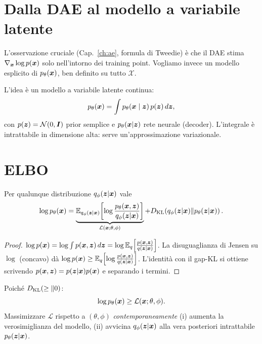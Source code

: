 \section{Dalla DAE al modello a variabile latente}

L'osservazione cruciale (Cap.~\ref{ch:ae}, formula di Tweedie) è che il DAE stima $\nabla_{\bm{x}} \log p(\bm{x})$ solo nell'intorno dei training point. Vogliamo invece un modello esplicito di $p_\theta(\bm{x})$, ben definito su tutto $\mathcal{X}$.

L'idea è un modello a variabile latente continua:
\begin{equation}\label{eq:lvm}
p_\theta(\bm{x}) = \int p_\theta(\bm{x}\mid \bm{z}) \, p(\bm{z})\, d\bm{z},
\end{equation}
con $p(\bm{z}) = \mathcal{N}(0, \bm{I})$ prior semplice e $p_\theta(\bm{x}|\bm{z})$ rete neurale (decoder). L'integrale è intrattabile in dimensione alta: serve un'approssimazione variazionale.

\section{ELBO}

\begin{theorem}
Per qualunque distribuzione $q_\phi(\bm{z}|\bm{x})$ vale
\[
\log p_\theta(\bm{x}) = \underbrace{\mathbb{E}_{q_\phi(\bm{z}|\bm{x})}\!\left[\log \frac{p_\theta(\bm{x},\bm{z})}{q_\phi(\bm{z}|\bm{x})}\right]}_{\mathcal{L}(\bm{x};\theta,\phi)} + D_{\mathrm{KL}}\!\left(q_\phi(\bm{z}|\bm{x}) \| p_\theta(\bm{z}|\bm{x})\right).
\]
\end{theorem}
\begin{proof}
$\log p(\bm{x}) = \log \int p(\bm{x},\bm{z})\,d\bm{z} = \log \mathbb{E}_q\!\left[\frac{p(\bm{x},\bm{z})}{q(\bm{z}|\bm{x})}\right]$. La disuguaglianza di Jensen su $\log$ (concavo) dà $\log p(\bm{x}) \geq \mathbb{E}_q\!\left[\log \frac{p(\bm{x},\bm{z})}{q(\bm{z}|\bm{x})}\right]$. L'identità con il gap-KL si ottiene scrivendo $p(\bm{x},\bm{z}) = p(\bm{z}|\bm{x}) p(\bm{x})$ e separando i termini.
\end{proof}

Poiché $D_{\mathrm{KL}}\!\left(\geq \| 0\right)$:
\begin{equation}
\log p_\theta(\bm{x}) \geq \mathcal{L}(\bm{x};\theta,\phi).
\end{equation}
Massimizzare $\mathcal{L}$ rispetto a $(\theta, \phi)$ \emph{contemporaneamente} (i) aumenta la verosimiglianza del modello, (ii) avvicina $q_\phi(\bm{z}|\bm{x})$ alla vera posteriori intrattabile $p_\theta(\bm{z}|\bm{x})$.

